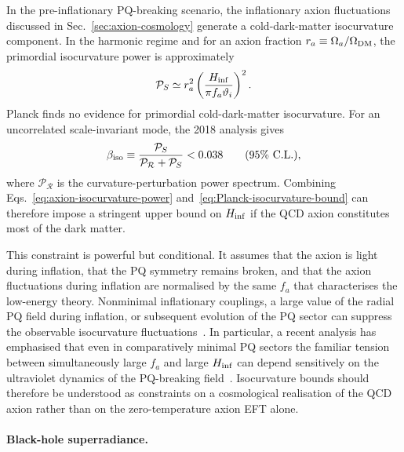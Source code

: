 \documentclass[review]{elsarticle}
\numberwithin{equation}{section}
\numberwithin{table}{section}
\numberwithin{figure}{section}
\begin{document}
In the pre-inflationary PQ-breaking scenario, the inflationary axion fluctuations discussed in Sec.~\ref{sec:axion-cosmology} generate a cold-dark-matter isocurvature component. In the harmonic regime and for an axion fraction $r_a\equiv\Omega_a/\Omega_{\rm DM}$, the primordial isocurvature power is approximately
\begin{align}
    \mathcal{P}_S
    \simeq
    r_a^2
    \left(
        \frac{H_{\rm inf}}
             {\pi f_a\vartheta_i}
    \right)^2 .
    \label{eq:axion-isocurvature-power}
\end{align}
Planck finds no evidence for primordial cold-dark-matter isocurvature. For an uncorrelated scale-invariant mode, the 2018 analysis gives~\cite{Planck:2018jri}
\begin{align}
    \beta_{\rm iso}
    \equiv
    \frac{\mathcal{P}_S}
         {\mathcal{P}_{\mathcal R}+\mathcal{P}_S}
    <
    0.038
    \qquad
    (95\%~{\rm C.L.}),
    \label{eq:Planck-isocurvature-bound}
\end{align}
where $\mathcal{P}_{\mathcal R}$ is the curvature-perturbation power spectrum. Combining Eqs.~\eqref{eq:axion-isocurvature-power} and~\eqref{eq:Planck-isocurvature-bound} can therefore impose a stringent upper bound on $H_{\rm inf}$ if the QCD axion constitutes most of the dark matter.

This constraint is powerful but conditional. It assumes that the axion is light during inflation, that the PQ symmetry remains broken, and that the axion fluctuations during inflation are normalised by the same $f_a$ that characterises the low-energy theory. Nonminimal inflationary couplings, a large value of the radial PQ field during inflation, or subsequent evolution of the PQ sector can suppress the observable isocurvature fluctuations~\cite{Marsh:2015xka,OHare:2024nmr,Graham:2025iwx}. In particular, a recent analysis has emphasised that even in comparatively minimal PQ sectors the familiar tension between simultaneously large $f_a$ and large $H_{\rm inf}$ can depend sensitively on the ultraviolet dynamics of the PQ-breaking field~\cite{Graham:2025iwx}. Isocurvature bounds should therefore be understood as constraints on a cosmological realisation of the QCD axion rather than on the zero-temperature axion EFT alone.

\paragraph{Black-hole superradiance.}
\end{document}
